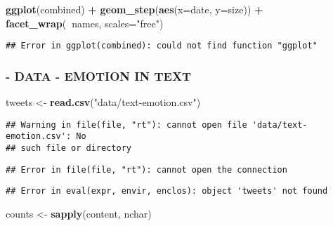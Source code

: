 \documentclass[]{article}
\newenvironment{Shaded}{\begin{snugshade}}{\end{snugshade}}
\newcommand{\KeywordTok}[1]{\textcolor[rgb]{0.13,0.29,0.53}{\textbf{#1}}}
\newcommand{\DataTypeTok}[1]{\textcolor[rgb]{0.13,0.29,0.53}{#1}}
\newcommand{\StringTok}[1]{\textcolor[rgb]{0.31,0.60,0.02}{#1}}
\newcommand{\OperatorTok}[1]{\textcolor[rgb]{0.81,0.36,0.00}{\textbf{#1}}}
\newcommand{\NormalTok}[1]{#1}
\begin{document}
\begin{Shaded}
\begin{Highlighting}[]
\KeywordTok{ggplot}\NormalTok{(combined) }\OperatorTok{+}\StringTok{ }\KeywordTok{geom_step}\NormalTok{(}\KeywordTok{aes}\NormalTok{(}\DataTypeTok{x=}\NormalTok{date, }\DataTypeTok{y=}\NormalTok{size)) }\OperatorTok{+}\StringTok{ }\KeywordTok{facet_wrap}\NormalTok{(}\OperatorTok{~}\NormalTok{names, }\DataTypeTok{scales=}\StringTok{"free"}\NormalTok{)}
\end{Highlighting}
\end{Shaded}

\begin{verbatim}
## Error in ggplot(combined): could not find function "ggplot"
\end{verbatim}

\subsubsection{- DATA - EMOTION IN TEXT}\label{data---emotion-in-text}

\begin{Shaded}
\begin{Highlighting}[]
\NormalTok{tweets <-}\StringTok{ }\KeywordTok{read.csv}\NormalTok{(}\StringTok{"data/text-emotion.csv"}\NormalTok{)}
\end{Highlighting}
\end{Shaded}

\begin{verbatim}
## Warning in file(file, "rt"): cannot open file 'data/text-emotion.csv': No
## such file or directory
\end{verbatim}

\begin{verbatim}
## Error in file(file, "rt"): cannot open the connection
\end{verbatim}

\begin{Shaded}
\end{Shaded}

\begin{verbatim}
## Error in eval(expr, envir, enclos): object 'tweets' not found
\end{verbatim}

\begin{Shaded}
\begin{Highlighting}[]
\NormalTok{counts <-}\StringTok{ }\KeywordTok{sapply}\NormalTok{(content, nchar)}
\end{Highlighting}
\end{Shaded}
\end{document}
